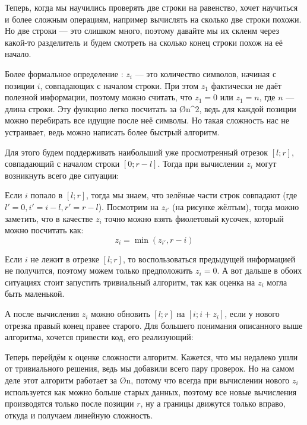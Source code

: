 Теперь, когда мы научились проверять две строки на равенство, хочет научиться и более сложным операциям, например вычислять на сколько две строки похожи. Но две строки — это слишком много, поэтому давайте мы их склеим через какой-то разделитель и будем смотреть на сколько конец строки похож на её начало.

Более формальное определение : $z_i$ — это количество символов, начиная с позиции $i$, совпадающих с началом строки. При этом $z_1$ фактически не даёт полезной информации, поэтому можно считать, что $z_1 = 0$ или $z_1 = n$, где $n$ — длина строки. Эту функцию легко посчитать за \O{n^2}, ведь для каждой позиции можно перебирать все идущие после неё символы. Но такая сложность нас не устраивает, ведь можно написать более быстрый алгоритм.

Для этого будем поддерживать наибольший уже просмотренный отрезок $[l; r]$, совпадающий с началом строки $[0; r - l]$. Тогда при вычислении $z_i$ могут возникнуть всего две ситуации:

\begin{wrapping}{0.34}
    Если $i$ попало в $[l; r]$, тогда мы знаем, что зелёные части строк совпадают (где $l' = 0, i' = i - l, r' = r - l$). Посмотрим на $z_{i'}$ (на рисунке жёлтым), тогда можно заметить, что в качестве $z_i$ точно можно взять фиолетовый кусочек, который можно посчитать как:
    $$z_i = \min(z_{i'}, r - i)$$
\end{wrapping}

Если $i$ не лежит в отрезке $[l; r]$, то воспользоваться предыдущей информацией не получится, поэтому можем только предположить $z_i = 0$. А вот дальше в обоих ситуациях стоит запустить тривиальный алгоритм, так как оценка на $z_i$ могла быть маленькой.

А после вычисления $z_i$ можно обновить $[l; r]$ на $[i; i + z_i]$, если у нового отрезка правый конец правее старого. Для большего понимания описанного выше алгоритма, хочется привести код, его реализующий:


Теперь перейдём к оценке сложности алгоритм. Кажется, что мы недалеко ушли от тривиального решения, ведь мы добавили всего пару проверок. Но на самом деле этот алгоритм работает за \O{n}, потому что всегда при вычислении нового $z_i$ используется как можно больше старых данных, поэтому все новые вычисления производятся только после позиции $r$, ну а границы движутся только вправо, откуда и получаем линейную сложность.



